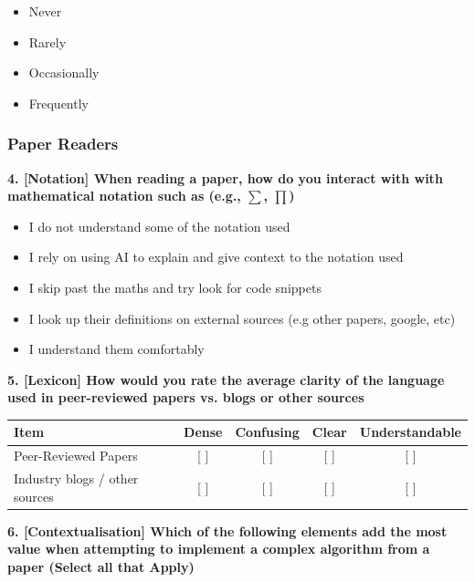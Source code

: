 \begin{itemize}
    \item Never
    \item Rarely
    \item Occasionally
    \item Frequently
\end{itemize}


\subsubsection{Paper Readers}

\textbf{4. [Notation] When reading a paper, how do you interact with with mathematical notation such as (e.g., $\sum$, $\prod$)}

\begin{itemize}
    \item I do not understand some of the notation used
    \item I rely on using AI to explain and give context to the notation used
    \item I skip past the maths and try look for code snippets
    \item I look up their definitions on external sources (e.g other papers, google, etc)
    \item I understand them comfortably
\end{itemize}

\vspace{2em}

\textbf{5. [Lexicon] How would you rate the average clarity of the language used in peer-reviewed papers vs. blogs or other sources}

\begin{table}[h]
\centering
\begin{tabular}{lcccc}
\toprule
Item & Dense & Confusing & Clear & Understandable \\
\midrule
Peer-Reviewed Papers & [ ] & [ ] & [ ] & [ ] \\
Industry blogs / other sources & [ ] & [ ] & [ ] & [ ] \\
\bottomrule
\end{tabular}
\end{table}

\vspace{2em}

\textbf{6. [Contextualisation] Which of the following elements add the most value when attempting to implement a complex algorithm from a paper (Select all that Apply)}

